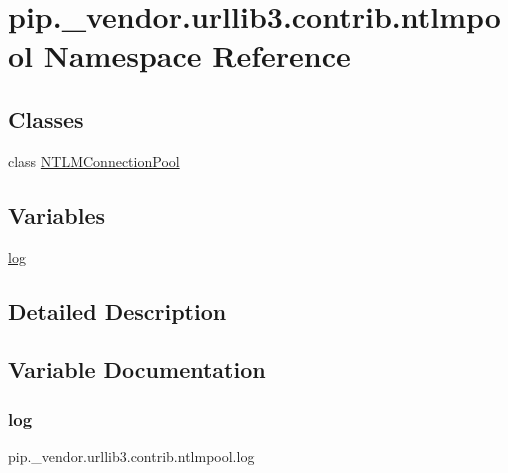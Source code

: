 \hypertarget{namespacepip_1_1__vendor_1_1urllib3_1_1contrib_1_1ntlmpool}{}\section{pip.\+\_\+vendor.\+urllib3.\+contrib.\+ntlmpool Namespace Reference}
\label{namespacepip_1_1__vendor_1_1urllib3_1_1contrib_1_1ntlmpool}
\subsection*{Classes}
\begin{DoxyCompactItemize}
\item 
class \hyperlink{classpip_1_1__vendor_1_1urllib3_1_1contrib_1_1ntlmpool_1_1NTLMConnectionPool}{N\+T\+L\+M\+Connection\+Pool}
\end{DoxyCompactItemize}
\subsection*{Variables}
\begin{DoxyCompactItemize}
\item 
\hyperlink{namespacepip_1_1__vendor_1_1urllib3_1_1contrib_1_1ntlmpool_afe99464d13b17f95426340fcb49c854d}{log}
\end{DoxyCompactItemize}


\subsection{Detailed Description}
 

\subsection{Variable Documentation}
\mbox{\label{namespacepip_1_1__vendor_1_1urllib3_1_1contrib_1_1ntlmpool_afe99464d13b17f95426340fcb49c854d}} 
\subsubsection{\texorpdfstring{log}{log}}
{\footnotesize\ttfamily pip.\+\_\+vendor.\+urllib3.\+contrib.\+ntlmpool.\+log}

